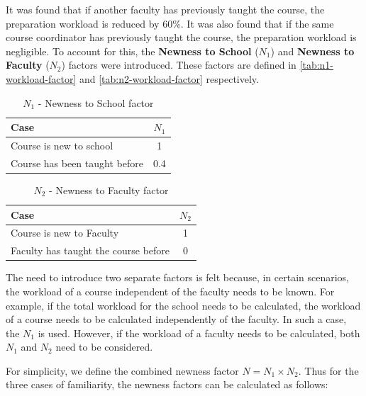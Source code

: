 It was found that if another faculty has previously taught the course, the preparation workload is reduced by 60\%. It was also found that if the same course coordinator has previously taught the course, the preparation workload is negligible. To account for this, the \textbf{Newness to School} (\(N_1\)) and \textbf{Newness to Faculty} (\(N_2\)) factors were introduced. These factors are defined in \autoref{tab:n1-workload-factor} and \autoref{tab:n2-workload-factor} respectively.

\begin{table}[ht]
  \centering
  \begin{tabular}{|l|c|}
    \hline
    \textbf{Case}                 & \textbf{\(N_1\)} \\ \hline
    Course is new to school       & 1                \\ \hline
    Course has been taught before & 0.4              \\ \hline
  \end{tabular}
  \caption{\(N_1\) - Newness to School factor}
  \label{tab:n1-workload-factor}
\end{table}

\begin{table}[ht]
  \centering
  \begin{tabular}{|l|c|}
    \hline
    \textbf{Case}                        & \textbf{\(N_2\)} \\ \hline
    Course is new to Faculty             & 1                \\ \hline
    Faculty has taught the course before & 0                \\ \hline
  \end{tabular}
  \caption{\(N_2\) - Newness to Faculty factor}
  \label{tab:n2-workload-factor}
\end{table}

The need to introduce two separate factors is felt because, in certain scenarios, the workload of a course independent of the faculty needs to be known. For example, if the total workload for the school needs to be calculated, the workload of a course needs to be calculated independently of the faculty. In such a case, the \(N_1\) is used. However, if the workload of a faculty needs to be calculated, both \(N_1\) and \(N_2\) need to be considered.

For simplicity, we define the combined newness factor \(N = N_1 \times N_2\). Thus for the three cases of familiarity, the newness factors can be calculated as follows:

